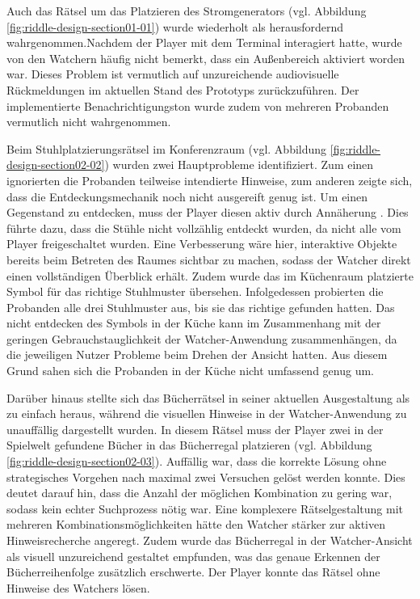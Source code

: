 Auch das Rätsel um das Platzieren des Stromgenerators  (vgl. Abbildung \ref{fig:riddle-design-section01-01}) wurde wiederholt als herausfordernd wahrgenommen.Nachdem der Player mit dem Terminal interagiert hatte, wurde von den Watchern häufig nicht bemerkt, dass ein Außenbereich aktiviert worden war. Dieses Problem ist vermutlich auf unzureichende audiovisuelle Rückmeldungen im aktuellen Stand des Prototyps zurückzuführen. Der implementierte Benachrichtigungston wurde zudem von mehreren Probanden vermutlich nicht wahrgenommen.

Beim Stuhlplatzierungsrätsel im Konferenzraum (vgl. Abbildung \ref{fig:riddle-design-section02-02}) wurden zwei Hauptprobleme identifiziert. Zum einen ignorierten die Probanden teilweise intendierte Hinweise, zum anderen zeigte sich, dass die Entdeckungsmechanik noch nicht ausgereift genug ist. Um einen Gegenstand zu entdecken, muss der Player diesen aktiv durch Annäherung . Dies führte dazu, dass die Stühle nicht vollzählig entdeckt wurden, da nicht alle vom Player freigeschaltet wurden. Eine Verbesserung wäre hier, interaktive Objekte bereits beim Betreten des Raumes sichtbar zu machen, sodass der Watcher direkt einen vollständigen Überblick erhält. Zudem wurde das im Küchenraum platzierte Symbol für das richtige Stuhlmuster übersehen. Infolgedessen probierten die Probanden alle drei Stuhlmuster aus, bis sie das richtige gefunden hatten. Das nicht entdecken des Symbols in der Küche kann im Zusammenhang mit der geringen Gebrauchstauglichkeit der Watcher-Anwendung zusammenhängen, da die jeweiligen Nutzer Probleme beim Drehen der Ansicht hatten. Aus diesem Grund sahen sich die Probanden in der Küche nicht umfassend genug um.

Darüber hinaus stellte sich das Bücherrätsel in seiner aktuellen Ausgestaltung als zu einfach heraus, während die visuellen Hinweise in der Watcher-Anwendung zu unauffällig dargestellt wurden. In diesem Rätsel muss der Player zwei in der Spielwelt gefundene Bücher in das Bücherregal platzieren   (vgl. Abbildung \ref{fig:riddle-design-section02-03}). Auffällig war, dass die korrekte Lösung ohne strategisches Vorgehen nach maximal zwei Versuchen gelöst werden konnte. Dies deutet darauf hin, dass die Anzahl der möglichen Kombination zu gering war, sodass kein echter Suchprozess nötig war. Eine komplexere Rätselgestaltung mit mehreren Kombinationsmöglichkeiten hätte den Watcher stärker zur aktiven Hinweisrecherche angeregt. Zudem wurde das Bücherregal in der Watcher-Ansicht als visuell unzureichend gestaltet empfunden, was das genaue Erkennen der Bücherreihenfolge zusätzlich erschwerte. Der Player konnte das Rätsel ohne Hinweise des Watchers lösen.

